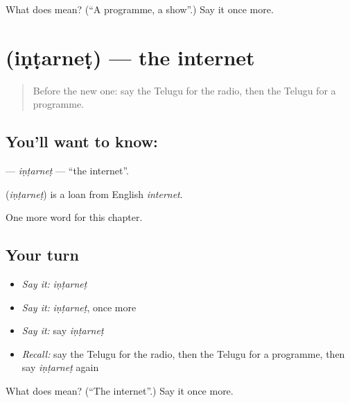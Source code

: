 \begin{tcolorbox}[breakable,colback=teal!4,colframe=teal!35!black,title={Before you move on}]
What does  mean? (\textquotedblleft{}A programme, a show\textquotedblright{}.) Say it once more.
\end{tcolorbox}
\section[\texorpdfstring{\te{ఇంటర్నెట్} (iṇṭarneṭ)}{ఇంటర్నెట్ (iṇṭarneṭ)}]{ (iṇṭarneṭ) — the internet}

\label{lesson:TE-C268-intarnet}



\begin{quote}
Before the new one: say the Telugu for the radio, then the Telugu for a programme.
\end{quote}

\subsection*{You'll want to know: }
\textbf{} — \emph{iṇṭarneṭ} — \textquotedblleft{}the internet\textquotedblright{}.

\begin{cousinweb}
\textbf{} (\emph{iṇṭarneṭ}) is a loan from English \emph{internet}.
\end{cousinweb}

\begin{grammarlens}[title={What you've built}]
One more word for this chapter.
\end{grammarlens}

\subsection*{Your turn}
\begin{itemize}
\raggedright
  \item \emph{Say it:} \emph{iṇṭarneṭ}
  \item \emph{Say it:} \emph{iṇṭarneṭ}, once more
  \item \emph{Say it:} say \emph{iṇṭarneṭ}
  \item \emph{Recall:} say the Telugu for the radio, then the Telugu for a programme, then say \emph{iṇṭarneṭ} again
\end{itemize}

\begin{tcolorbox}[breakable,colback=teal!4,colframe=teal!35!black,title={Before you move on}]
What does  mean? (\textquotedblleft{}The internet\textquotedblright{}.) Say it once more.
\end{tcolorbox}
